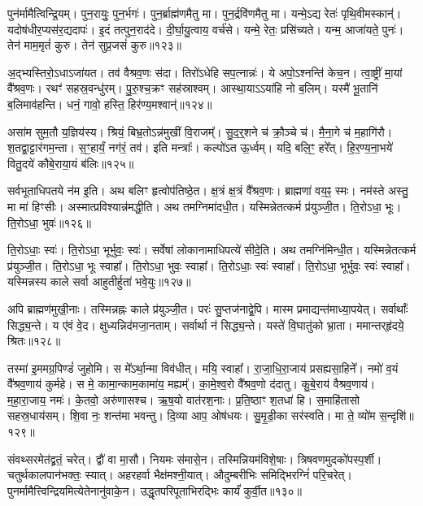 पुन॑र्मामैत्विन्द्रि॒यम्। पुन॒रायुः॒ पुन॒र्भगः॑। 
पुन॒र्ब्राह्म॑णमैतु मा। पुन॒र्द्रवि॑णमैतु मा। 
यन्मे॒\-ऽद्य रेतः॑ पृथि॒वीमस्कान्॑। यदोष॑धीर॒प्यस॑र॒द्यदापः॑। 
इ॒दं तत्पुन॒राद॑दे। दी॒र्घा॒यु॒त्वाय॒ वर्च॑से। 
यन्मे॒ रेतः॒ प्रसि॑च्यते। यन्म॒ आजा॑यते॒ पुनः॑। 
तेन॑ माम॒मृतं॑ कुरु। तेन॑ सुप्र॒जसं॑ कुरु॥१२३॥\ip\anuvakamend


अ॒द्भ्यस्तिरो॒\-ऽधा\-ऽजा॑यत। तव॑ वैश्रव॒णः स॑दा। 
तिरो॑\-ऽधेहि सप॒त्नान्नः॑। ये अपो॒\-ऽश्नन्ति॑ केच॒न। 
त्वा॒ष्ट्रीं मा॒यां वै᳚श्रव॒णः। रथꣳ॑ सहस्र॒वन्धु॑रम्। 
पु॒रु॒श्च॒क्रꣳ सह॑स्राश्वम्। आस्था॒या\-ऽऽया॑हि नो ब॒लिम्। 
यस्मै॑ भू॒तानि॑ ब॒लिमाव॑हन्ति। धनं॒ गावो॒ हस्ति॒ हिर॑ण्य॒मश्वान्॑॥१२४॥\ip


असा॑म सुम॒तौ य॒ज्ञिय॑स्य। श्रियं॒ बिभ्र॒तो\-ऽन्न॑मुखीं वि॒राजम्‌᳚। 
सु॒द॒र्॒‌शने च॑ क्रौ॒ञ्चे च॑। मै॒ना॒गे च॑ म॒हागि॑रौ। 
श॒तद्वा॒ट्टार॑गम॒न्ता। स॒ꣳ॒हार्यं॒ नग॑रं॒ तव॑। 
इति मन्त्राः᳚। कल्पो॑\-ऽत ऊ॒र्ध्वम्। यदि॒ बलि॒ꣳ॒ हरे᳚त्। 
हि॒र॒ण्य॒ना॒भये॑ वितु॒दये॑ कौबे॒राया॒यं ब॑लिः॥१२५॥\ip


सर्वभूताधिपतये न॑म इ॒ति। अथ बलिꣳ हृत्वोप॑तिष्ठे॒त। 
क्ष॒त्रं क्ष॒त्रं वै᳚श्रव॒णः। ब्राह्मणा॑ वय॒ꣴ॒ स्मः। 
नम॑स्ते अस्तु॒ मा मा॑ हिꣳसीः। अस्मात्प्रविश्यान्न॑मद्धी॒ति। 
अथ तमग्निमा॑दधी॒त। यस्मिन्नेतत्कर्म प्र॑युञ्जी॒त। 
ति॒रो\-ऽधा॒ भूः। ति॒रो\-ऽधा॒ भुवः॑॥१२६॥\ip


ति॒रो\-ऽधाः॒ स्वः॑। ति॒रो\-ऽधा॒ भूर्भुवः॒ स्वः॑। 
सर्वेषां लोकानामाधिपत्ये॑ सीदे॒ति। अथ तमग्नि॑मिन्धी॒त। 
यस्मिन्नेतत्कर्म प्र॑युञ्जी॒त। ति॒रो\-ऽधा॒ भूः स्वाहा᳚। 
ति॒रो\-ऽधा॒ भुवः॒ स्वाहा᳚। ति॒रो\-ऽधाः॒ स्वः॑ स्वाहा᳚। 
ति॒रो\-ऽधा॒ भूर्भुवः॒ स्वः॑ स्वाहा᳚। 
यस्मिन्नस्य काले सर्वा आहुतीर्\mbox{}हुता॑ भवे॒युः॥१२७॥\ip


अपि ब्राह्मण॑मुखी॒नाः। तस्मिन्नह्नः काले प्र॑युञ्जी॒त। 
परः॑ सु॒प्तज॑नाद्वे॒पि। मास्म प्रमाद्यन्त॑माध्या॒पयेत्। 
सर्वार्थाः᳚ सिद्ध्य॒न्ते। य ए॑वं वे॒द। 
क्षुध्यन्निद॑म\-जा॒न\-ताम्। सर्वार्था न॑ सिद्ध्य॒न्ते। 
यस्ते॑ वि॒घातु॑को भ्रा॒ता। ममान्तर्‌हृ॑दये॒ श्रितः॥१२८॥\ip


तस्मा॑ इ॒ममग्र॒पिण्डं॑ जुहोमि। स मे᳚\-ऽर्था॒न्मा विव॑धीत्। 
मयि॒ स्वाहा᳚। रा॒जा॒धि॒रा॒जाय॑ प्रसह्यसा॒हिने᳚। 
नमो॑ व॒यं वै᳚श्रव॒णाय॑ कुर्महे। स मे॒ कामा॒न्काम॒कामा॑य॒ मह्यम्‌᳚। 
का॒मे॒श्व॒रो वै᳚श्रव॒णो द॑दातु। कु॒बे॒राय॑ वैश्रव॒णाय॑। 
म॒हा॒रा॒जाय॒ नमः॑। के॒तवो॒ अरु॑णासश्च। 
ऋ॒ष॒यो वात॑रश॒नाः। प्र॒ति॒ष्ठाꣳ श॒तधा॑ हि। 
स॒माहि॑तासो सहस्र॒धाय॑सम्। शि॒वा नः॒ शन्त॑मा भवन्तु। 
दि॒व्या आप॒ ओष॑धयः। सु॒मृ॒डी॒का सर॑स्वति। 
मा ते॒ व्यो॑म स॒न्दृशि॑॥१२९॥\ip\anuvakamend


संवथ्सरमेत॑द्व्रतं॒ चरेत्। द्वौ॑ वा मा॒सौ। 
नियमः स॑मासे॒न। तस्मिन्नियम॑\-विशे॒षाः। 
त्रिषवणमुदको॑पस्प॒र्शी। चतुर्थकालपान॑भक्तः॒ स्यात्। 
अहरहर्वा भैक्ष॑मश्नी॒यात्। औदुम्बरीभिः समिद्भिरग्निं॑ परि॒चरेत्। 
पुनर्मामैत्त्विन्द्रियमि\-त्येतेनानु॑वाके॒न। उद्धृतपरिपूताभि\-रद्भिः कार्यं॑ कुर्वी॒त॥१३०॥\ip


